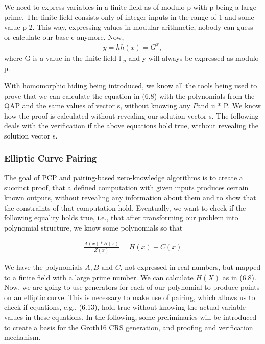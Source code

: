 We need to express variables in a finite field as of modulo p with p being a large prime. The finite field consists only of integer inputs in the range of 1 and some value p-2. This way, expressing values in modular arithmetic, nobody can guess or calculate our base e anymore. Now,
\begin{align}
    y = hh(x) = G^x,
\end{align}
where G is a value in the finite field \begin{math}\mathbb{F}_p\end{math} and y will always be expressed as modulo p.

With homomorphic hiding being introduced, we know all the tools being used to prove that we can calculate the equation in (6.8) with the polynomials from the QAP and the same values of vector s, without knowing any \(P\)and u * P. We know how the proof is calculated without revealing our solution vector s. The following deals with the verification if the above equations hold true, without revealing the solution vector s.

\subsubsection{Elliptic Curve Pairing}

The goal of PCP and pairing-based zero-knowledge algorithms is to create a succinct proof, that a defined computation with given inputs produces certain known outputs, without revealing any information about them and to show that the constraints of that computation hold. Eventually, we want to check if the following equality holds true, i.e., that after transforming our problem into polynomial structure, we know some polynomials so that

\begin{align}
    \frac{A(x) * B(x)}{Z(x)} = H(x) + C(x)
\end{align}

We have the polynomials \(A, B \text{ and }C\), not expressed in real numbers, but mapped to a finite field with a large prime number. We can calculate \(H(X)\) as in (6.8). Now, we are going to use generators for each of our polynomial to produce points on an elliptic curve. This is necessary to make use of pairing, which allows us to check if equations, e.g., (6.13), hold true without knowing the actual variable values in these equations. In the following, some preliminaries will be introduced to create a basis for the Groth16 CRS generation, and proofing and verification mechanism.

